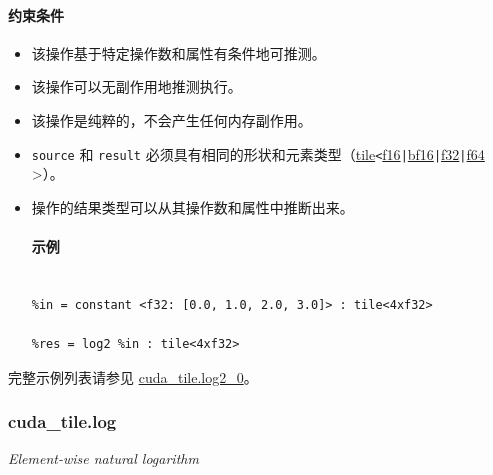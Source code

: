 \documentclass{article}
\begin{document}
\paragraph{约束条件}


\begin{itemize}
\item 该操作基于特定操作数和属性有条件地可推测。
\item 该操作可以无副作用地推测执行。
\item 该操作是纯粹的，不会产生任何内存副作用。
\item \texttt{source} 和 \texttt{result} 必须具有相同的形状和元素类型（\href{https://docs.nvidia.com/cuda/tile-ir/latest/sections/types.html#type-tile}{tile}\texttt{<}\href{https://docs.nvidia.com/cuda/tile-ir/latest/sections/types.html#subsection-element-types}{f16}\texttt{|}\href{https://docs.nvidia.com/cuda/tile-ir/latest/sections/types.html#subsection-element-types}{bf16}\texttt{|}\href{https://docs.nvidia.com/cuda/tile-ir/latest/sections/types.html#subsection-element-types}{f32}\texttt{|}\href{https://docs.nvidia.com/cuda/tile-ir/latest/sections/types.html#subsection-element-types}{f64} >）。
\item 操作的结果类型可以从其操作数和属性中推断出来。




\paragraph{示例}


\begin{lstlisting}

%in = constant <f32: [0.0, 1.0, 2.0, 3.0]> : tile<4xf32>

%res = log2 %in : tile<4xf32>

\end{lstlisting}



\end{itemize}
完整示例列表请参见 \href{https://docs.nvidia.com/cuda/tile-ir/latest/sections/appendix.html#example-cuda-tile-log2-0}{cuda\_tile.log2\_0}。





\subsubsection{cuda\_tile.log}


\textit{Element-wise natural logarithm}
\end{document}
